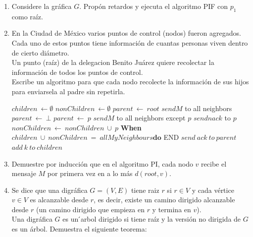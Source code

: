 \documentclass[12pt,a4paper]{report}
\begin{document}
\begin{enumerate}
	\item {
		Considere la gráfica $G$. Propón retardos y ejecuta el algoritmo PIF con
		$p_1$ como raíz.\\
	}

	\item {
		En la Ciudad de México varios puntos de control (nodos) fueron agregados.\\
		Cada uno de estos puntos tiene información de cuantas personas viven
		dentro de cierto diámetro. \\
		Un punto (raíz) de la delegacion Benito Juárez quiere recolectar la
		información de todos los puntos de control. \\
		Escribe un algoritmo para que cada nodo recolecte la información de sus
		hijos para enviarsela al padre sin repetirla.\\

			\begin{algorithmic}[1]
				\State $children \ \leftarrow \emptyset$
				\State $nonChildren \ \leftarrow \emptyset$
					\State $parent\ \leftarrow\ root$
					\State $send M$ to all neighbors
				\Else
					\State $parent\ \leftarrow\ \bot$
				\EndIf
				\State {}
				\Start
						\State $parent\ \leftarrow\ p$
						\State $send M$ to all neighbors except $p$
					\Else
						\State $send nack$ to $p$
					\EndIf
				\End
				\State {}
				\Start
					\State $nonChildren\ \leftarrow\ nonChildren\ \cup\ {p}$
				\End
				\textbf{When} $children\ \cup\ nonChildren\ =\ allMyNeighbours
							\textbf{do}$
				\Start
						\State END
					\Else
						\State $send\ ack\ to\ parent$
					\EndIf
				\Start
					\State $add\ k\ to\ children$
				\End
				\End
			\end{algorithmic}
		}

	\item{
		Demuestre por inducción que en el algoritmo PI, cada nodo $v$ recibe el
		mensaje $M$ por primera vez en a lo más $d(root, v)$.\\
	}
	\item{
		Se dice que una digráfica $G = (V, E)$ tiene raiz $r$ si $r \in V$ y cada
		vértice $v \in V$ es alcanzable desde $r$, es decir, existe un camino
		dirigido alcanzable desde $r$ (un camino dirigido que empieza en $r$ y
		termina en $v$).\\
		Una digráfica $G$ es un  ́arbol dirigido si tiene raíz y la versión no dirigida
		de $G$ es un árbol. Demuestra el siguiente teorema:\\

}
\end{enumerate}
\end{document}

